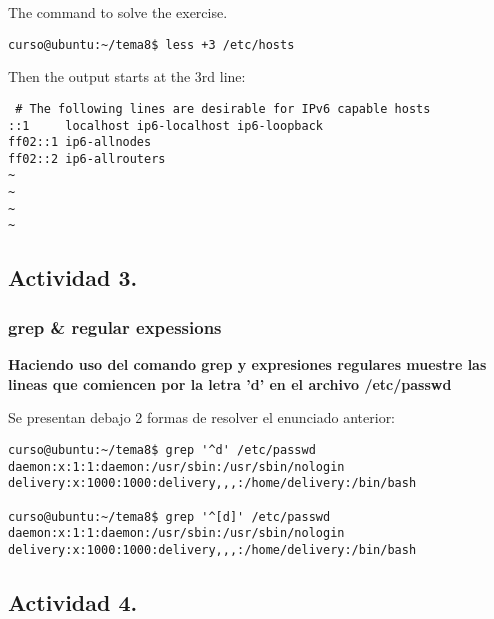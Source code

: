 \documentclass[a4paper,11pt,spanish]{article} %
\newenvironment{myscriptlisting}
{\begin{list}{}{\setlength{\leftmargin}{1em}}\item\scriptsize\bfseries}
{\end{list}}
\begin{document}
The command to solve the exercise.

\begin{myscriptlisting}
 \begin{verbatim}
curso@ubuntu:~/tema8$ less +3 /etc/hosts
 \end{verbatim}
\end{myscriptlisting}

Then the output starts at the 3rd line:

\begin{myscriptlisting}
 \begin{verbatim}
 # The following lines are desirable for IPv6 capable hosts
::1     localhost ip6-localhost ip6-loopback
ff02::1 ip6-allnodes
ff02::2 ip6-allrouters
~
~
~
~
 \end{verbatim}
\end{myscriptlisting}


\subsection{Actividad 3.}

\subsubsection{grep \& regular expessions}

\textbf{Haciendo uso del comando grep y expresiones regulares muestre las lineas
que comiencen por la letra 'd' en el archivo /etc/passwd}

Se presentan debajo 2 formas de resolver el enunciado anterior:

\begin{myscriptlisting}
 \begin{verbatim}
curso@ubuntu:~/tema8$ grep '^d' /etc/passwd
daemon:x:1:1:daemon:/usr/sbin:/usr/sbin/nologin
delivery:x:1000:1000:delivery,,,:/home/delivery:/bin/bash

curso@ubuntu:~/tema8$ grep '^[d]' /etc/passwd
daemon:x:1:1:daemon:/usr/sbin:/usr/sbin/nologin
delivery:x:1000:1000:delivery,,,:/home/delivery:/bin/bash

 \end{verbatim}

\end{myscriptlisting}


\subsection{Actividad 4.}
\end{document}
